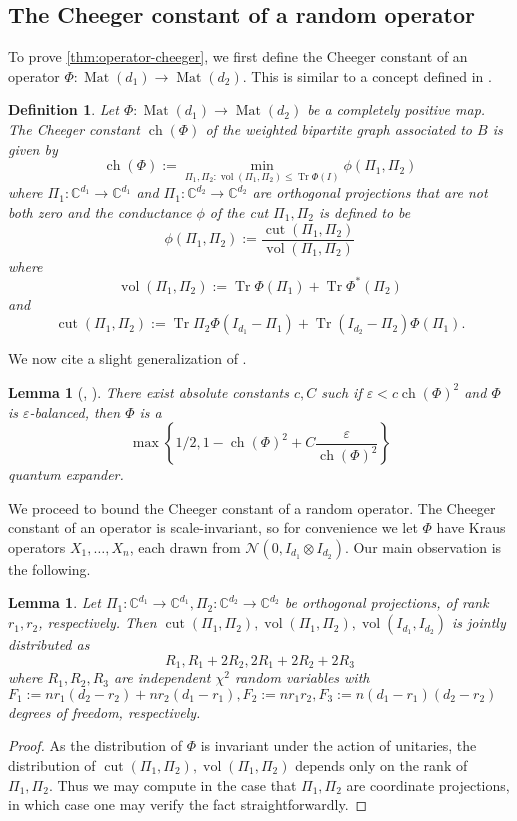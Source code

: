 \documentclass{article}
\newtheorem{lemma}[theorem]{Lemma}
\newtheorem{definition}{Definition}
\newcommand{\C}{{\mathbb{C}}}
\newcommand{\ot}{\otimes}
\newcommand{\mat}{\operatorname{Mat}}
\newcommand{\ch}{\operatorname{ch}}
\newcommand{\cut}{\operatorname{cut}}
\newcommand{\vol}{\operatorname{vol}}
\newcommand\eps{\varepsilon}
\newcommand\cN{\mathcal{N}}
\newcommand\tr{\operatorname{Tr}}
\begin{document}
\subsection{The Cheeger constant of a random operator}

To prove \cref{thm:operator-cheeger}, we first define the Cheeger constant of an operator $\Phi:\mat(d_1) \to \mat(d_2)$. This is similar to a concept defined in \cite{H07}.
\begin{definition}
Let $\Phi : \mat(d_1) \to \mat(d_2)$ be a completely positive map. The Cheeger constant $\ch(\Phi)$ of the weighted bipartite graph associated to $B$ is given by
$$\ch(\Phi):=\min_{\Pi_1, \Pi_2: \vol(\Pi_1, \Pi_2) \leq \tr \Phi(I)} \phi(\Pi_1,\Pi_2)$$
where $\Pi_1: \C^{d_1} \to \C^{d_1}$ and $\Pi_1: \C^{d_2} \to \C^{d_2}$ are orthogonal projections that are not both zero and the \emph{conductance} $\phi$ of the cut $\Pi_1, \Pi_2$ is defined to be
$$\phi(\Pi_1,\Pi_2) := \frac{\cut(\Pi_1, \Pi_2)}{\vol(\Pi_1,\Pi_2)}$$
where
$$ \vol(\Pi_1,\Pi_2):=
\tr \Phi(\Pi_1) + \tr \Phi^*(\Pi_2)$$
and $$ \cut(\Pi_1, \Pi_2):= \tr \Pi_2 \Phi(I_{d_1} - \Pi_1) + \tr (I_{d_2} - \Pi_2) \Phi(\Pi_1).$$
\end{definition}

We now cite a slight generalization of \cite{FM20}.

\begin{lemma} [\cite{FM20}, \cite{KLR19}]\label{lem:op-cheeger} There exist absolute constants $c, C$ such if $\eps < c \ch(\Phi)^2$ and $\Phi$ is $\eps$-balanced, then $\Phi$ is a
$$ \max\left\{1/2, 1 -  \ch(\Phi)^2 + C \frac{\eps}{\ch(\Phi)^2} \right\}$$
quantum expander.
\end{lemma}
We proceed to bound the Cheeger constant of a random operator. The Cheeger constant of an operator is scale-invariant, so for convenience we let $\Phi$ have Kraus operators $X_1, \dots, X_n$, each drawn from $\cN(0,  I_{d_1} \ot I_{d_2}).$ Our main observation is the following.

\begin{lemma}\label{fact:chi} Let $\Pi_1:\C^{d_1} \to \C^{d_1}, \Pi_2: \C^{d_2} \to \C^{d_2}$ be orthogonal projections, of rank $r_1, r_2$, respectively. Then $\cut(\Pi_1, \Pi_2), \vol(\Pi_1, \Pi_2), \vol(I_{d_1}, I_{d_2})$ is jointly distributed as
$$ R_1, R_1 + 2R_2, 2R_1 + 2 R_2 + 2R_3$$ where
$R_1, R_2, R_3$ are independent $\chi^2$ random variables with $F_1:=n r_1(d_2 - r_2) + n r_2(d_1-r_1), F_2:= n r_1r_2, F_3:= n(d_1 - r_1)(d_2 - r_2)$ degrees of freedom, respectively.
\end{lemma}
\begin{proof} As the distribution of $\Phi$ is invariant under the action of unitaries, the distribution of $\cut(\Pi_1, \Pi_2), \vol(\Pi_1, \Pi_2)$ depends only on the rank of $\Pi_1, \Pi_2$. Thus we may compute in the case that $\Pi_1, \Pi_2$ are coordinate projections, in which case one may verify the fact straightforwardly.
\end{proof}
\end{document}
